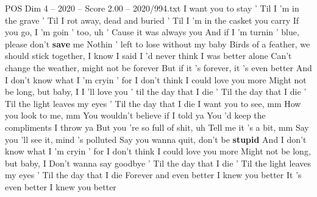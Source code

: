 \begin{textsample}{POS Dim 4 – 2020 – Score 2.00 – 2020/994.txt}  \label{ex:f4_pos_028}
I want you to stay ' Til I 'm in the grave ' Til I rot away, dead and buried ' Til I 'm in the casket you carry If you go, I 'm goin ' too, uh ' Cause it was always you And if I 'm turnin ' blue, please don't \textbf{save} me Nothin ' left to lose without my baby Birds of a feather, we should stick together, I know I said I 'd never think I was better alone Can't change the weather, might not be forever But if it 's forever, it 's even better And I don't know what I 'm cryin ' for I don't think I could love you more Might not be long, but baby, I I 'll love you ' til the day that I die ' Til the day that I die ' Til the light leaves my eyes ' Til the day that I die I want you to see, mm How you look to me, mm You wouldn't believe if I told ya You 'd keep the compliments I throw ya But you 're so full of shit, uh Tell me it 's a bit, mm Say you 'll see it, mind 's polluted Say you wanna quit, don't be \textbf{stupid} And I don't know what I 'm cryin ' for I don't think I could love you more Might not be long, but baby, I Don't wanna say goodbye ' Til the day that I die ' Til the light leaves my eyes ' Til the day that I die Forever and even better I knew you better It 's even better I knew you better

\end{textsample}

